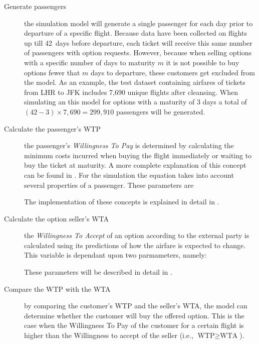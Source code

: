 \begin{description}
\item[Generate passengers] the simulation model will generate a single passenger for each day prior to departure of a specific flight. Because data have been collected on flights up till 42~days before departure, each ticket will receive this same number of passengers with option requests. However, because when selling options with a specific number of days to maturity $m$ it is not possible to buy options fewer that $m$ days to departure, these customers get excluded from the model. As an example, the test dataset containing airfares of tickets from LHR to JFK includes 7,690 unique flights after cleansing. When simulating an this model for options with a maturity of 3 days a total of $(42 - 3) \times 7,690 = 299,910$ passengers will be generated.
\item[Calculate the passenger's WTP] the passenger's \emph{Willingness To Pay} is determined by calculating the minimum costs incurred when buying the flight immediately or waiting to buy the ticket at maturity. A more complete explanation of this concept can be found in . For the simulation the equation takes into account several properties of a passenger. These parameters are  The implementation of these concepts is explained in detail in .
\item[Calculate the option seller's WTA] the \emph{Willingness To Accept} of an option according to the external party is calculated using its predictions of how the airfare is expected to change. This variable is dependant upon two parmameters, namely:  These parameters will be described in detail in .
\item[Compare the WTP with the WTA] by comparing the customer's WTP and the seller's WTA, the model can determine whether the customer will buy the offered option. This is the case when the Willingness To Pay of the customer for a certain flight is higher than the Willingness to accept of the seller (i.e., $\text{WTP} \ge \text{WTA}$).

\end{description}
